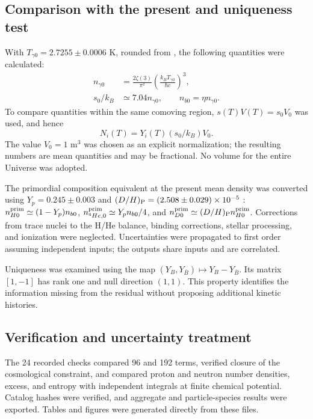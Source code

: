 \subsection{Comparison with the present and uniqueness test}
With $T_{\gamma0}=2.7255\pm0.0006$ K, rounded from \citet{Fixsen2009}, the following quantities were calculated:
\begin{align}
n_{\gamma0}&=\frac{2\zeta(3)}{\pi^2}
\left(\frac{k_BT_{\gamma0}}{\hbar c}\right)^3,\nonumber\\
s_0/k_B&\simeq7.04n_{\gamma0},\qquad
n_{b0}=\eta n_{\gamma0}.\label{eq:present}
\end{align}
To compare quantities within the same comoving region, $s(T)V(T)=s_0V_0$ was used, and hence
\begin{equation}
N_i(T)=Y_i(T)(s_0/k_B)V_0.\label{eq:comoving}
\end{equation}
The value $V_0=1$ m$^3$ was chosen as an explicit normalization; the resulting numbers are mean quantities and may be fractional. No volume for the entire Universe was adopted.

The primordial composition equivalent at the present mean density was converted using $Y_p=0.245\pm0.003$ and $(D/H)_{\rm P}=(2.508\pm0.029)\times10^{-5}$ \citep{Fields2025}: $n_{H0}^{\rm prim}\simeq(1-Y_p)n_{b0}$, $n_{{}^4He,0}^{\rm prim}\simeq Y_p n_{b0}/4$, and $n_{D0}^{\rm prim}\simeq(D/H)_{\rm P}n_{H0}^{\rm prim}$. Corrections from trace nuclei to the H/He balance, binding corrections, stellar processing, and ionization were neglected. Uncertainties were propagated to first order assuming independent inputs; the outputs share inputs and are correlated.

Uniqueness was examined using the map $(Y_B,Y_{\bar B})\mapsto Y_B-Y_{\bar B}$. Its matrix $[1,-1]$ has rank one and null direction $(1,1)$. This property identifies the information missing from the residual without proposing additional kinetic histories.

\subsection{Verification and uncertainty treatment}
The 24 recorded checks compared 96 and 192 terms, verified closure of the cosmological constraint, and compared proton and neutron number densities, excess, and entropy with independent integrals at finite chemical potential. Catalog hashes were verified, and aggregate and particle-species results were exported. Tables and figures were generated directly from these files.

